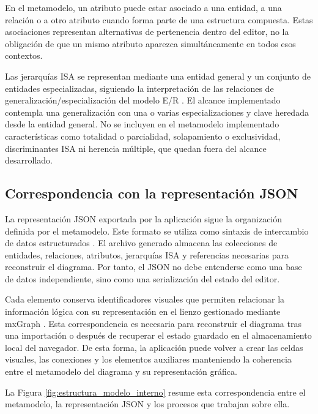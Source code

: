 En el metamodelo, un atributo puede estar asociado a una entidad, a una relación o a otro atributo cuando forma parte de una estructura compuesta. Estas asociaciones representan alternativas de pertenencia dentro del editor, no la obligación de que un mismo atributo aparezca simultáneamente en todos esos contextos.

Las jerarquías ISA se representan mediante una entidad general y un conjunto de entidades especializadas, siguiendo la interpretación de las relaciones de generalización/especialización del modelo E/R \cite{tema6}. El alcance implementado contempla una generalización con una o varias especializaciones y clave heredada desde la entidad general. No se incluyen en el metamodelo implementado características como totalidad o parcialidad, solapamiento o exclusividad, discriminantes ISA ni herencia múltiple, que quedan fuera del alcance desarrollado.

\subsection{Correspondencia con la representación JSON}

La representación JSON exportada por la aplicación sigue la organización definida por el metamodelo. Este formato se utiliza como sintaxis de intercambio de datos estructurados \cite{ecma-json}. El archivo generado almacena las colecciones de entidades, relaciones, atributos, jerarquías ISA y referencias necesarias para reconstruir el diagrama. Por tanto, el JSON no debe entenderse como una base de datos independiente, sino como una serialización del estado del editor.

Cada elemento conserva identificadores visuales que permiten relacionar la información lógica con su representación en el lienzo gestionado mediante mxGraph \cite{mxgraph}. Esta correspondencia es necesaria para reconstruir el diagrama tras una importación o después de recuperar el estado guardado en el almacenamiento local del navegador. De esta forma, la aplicación puede volver a crear las celdas visuales, las conexiones y los elementos auxiliares manteniendo la coherencia entre el metamodelo del diagrama y su representación gráfica.

La Figura \ref{fig:estructura_modelo_interno} resume esta correspondencia entre el metamodelo, la representación JSON y los procesos que trabajan sobre ella.


